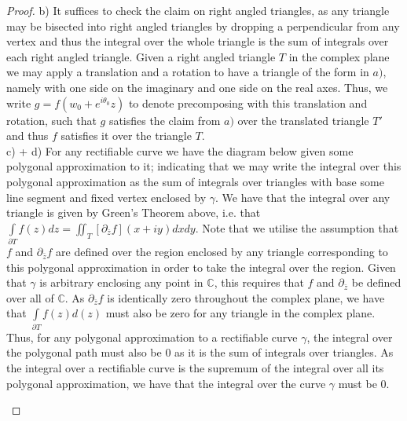 \documentclass{article}
\newcommand{\bb}[1]{\mathbb{#1}}
\newcommand{\del}{\partial}
\begin{document}
\begin{proof}
  b) It suffices to check the claim on right angled triangles, as any triangle may be bisected into right angled triangles by dropping a perpendicular from any vertex and thus the integral over the whole triangle is the sum of integrals over each right angled triangle. Given a right angled triangle $T$ in the complex plane we may apply a translation and a rotation to have a triangle of the form in $a)$, namely with one side on the imaginary and one side on the real axes. Thus, we write $g = f(w_{0} + e^{i\theta_{0}}z)$ to denote precomposing with this translation and rotation, such that $g$ satisfies the claim from $a)$ over the translated triangle $T'$ and thus $f$ satisfies it over the triangle $T$. \\

  c) + d) For any rectifiable curve we have the diagram below given some polygonal approximation to it; indicating that we may write the integral over this polygonal approximation as the sum of integrals over triangles with base some line segment and fixed vertex enclosed by $\gamma$. We have that the integral over any triangle is given by Green's Theorem above, i.e. that $\int\limits_{\del T}f(z)dz = \iint_{T}[\del_{\bar{z}}f](x+iy)dxdy$. Note that we utilise the assumption that $f$ and $\del_{\bar{z}} f$ are defined over the region enclosed by any triangle corresponding to this polygonal approximation in order to take the integral over the region. Given that $\gamma$ is arbitrary enclosing any point in $\bb{C}$, this requires that $f$ and $\del_{\bar{z}}$ be defined over all of $\bb{C}$. As $\del_{\bar{z}}f$ is identically zero throughout the complex plane, we have that $\int\limits_{\del T}f(z)d(z)$ must also be zero for any triangle in the complex plane. Thus, for any polygonal approximation to a rectifiable curve $\gamma$, the integral over the polygonal path must also be $0$ as it is the sum of integrals over triangles. As the integral over a rectifiable curve is the supremum of the integral over all its polygonal approximation, we have that the integral over the curve $\gamma$ must be $0$.
  
  \begin{center}
    

\begin{tikzpicture}[x=0.75pt,y=0.75pt,yscale=-1,xscale=1]


\end{tikzpicture}
\end{center}
\end{proof}
\end{document}
